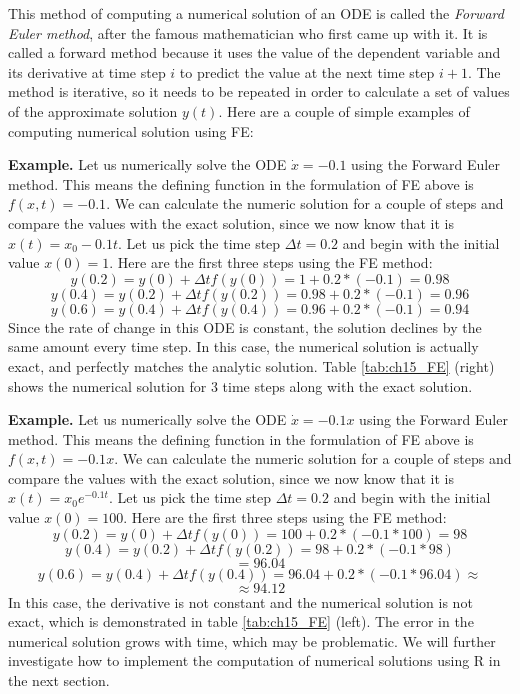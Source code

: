\documentclass[
  letterpaper,
  DIV=11,
  numbers=noendperiod]{scrreprt}
\begin{document}
This method of computing a numerical solution of an ODE is called the
 \emph{Forward Euler
method}, after the famous mathematician who first came up with it. It is
called a forward method because it uses the value of the dependent
variable and its derivative at time step \(i\) to predict the value at
the next time step \(i+1\). The method is iterative, so it needs to be
repeated in order to calculate a set of values of the approximate
solution \(y(t)\). Here are a couple of simple examples of computing
numerical solution using FE:

\textbf{Example.} Let us numerically solve the ODE \(\dot x = -0.1\)
using the Forward Euler method. This means the defining function in the
formulation of FE above is \(f(x,t)=-0.1\). We can calculate the numeric
solution for a couple of steps and compare the values with the exact
solution, since we now know that it is \(x(t) = x_0 -0.1t\). Let us pick
the time step \(\Delta t = 0.2\) and begin with the initial value
\(x(0)=1\). Here are the first three steps using the FE method:
\[ y(0.2) = y(0) + \Delta t f(y(0)) = 1 + 0.2*(-0.1) = 0.98\]
\[ y(0.4) = y(0.2) + \Delta t f(y(0.2)) = 0.98+ 0.2*(-0.1) = 0.96\]
\[ y(0.6) = y(0.4) + \Delta t f(y(0.4)) = 0.96+ 0.2*(-0.1) = 0.94\]
Since the rate of change in this ODE is constant, the solution declines
by the same amount every time step. In this case, the numerical solution
is actually exact, and perfectly matches the analytic solution. Table
\ref{tab:ch15_FE} (right) shows the numerical solution for 3 time steps
along with the exact solution.

\textbf{Example.} Let us numerically solve the ODE \(\dot x = -0.1x\)
using the Forward Euler method. This means the defining function in the
formulation of FE above is \(f(x,t)=-0.1x\). We can calculate the
numeric solution for a couple of steps and compare the values with the
exact solution, since we now know that it is \(x(t) = x_0 e^{-0.1t}\).
Let us pick the time step \(\Delta t = 0.2\) and begin with the initial
value \(x(0)=100\). Here are the first three steps using the FE method:
\[ y(0.2) = y(0) + \Delta t f(y(0)) = 100 + 0.2*(-0.1*100) = 98\]
\[ y(0.4) = y(0.2) + \Delta t f(y(0.2)) = 98+ 0.2*(-0.1*98) \]
\[ = 96.04\]
\[ y(0.6) = y(0.4) + \Delta t f(y(0.4)) = 96.04+ 0.2*(-0.1*96.04) \approx  \]
\[ \approx 94.12\] In this case, the derivative is not constant and the
numerical solution is not exact, which is demonstrated in table
\ref{tab:ch15_FE} (left). The error in the numerical solution grows with
time, which may be problematic. We will further investigate how to
implement the computation of numerical solutions using R in the next
section.
\end{document}
